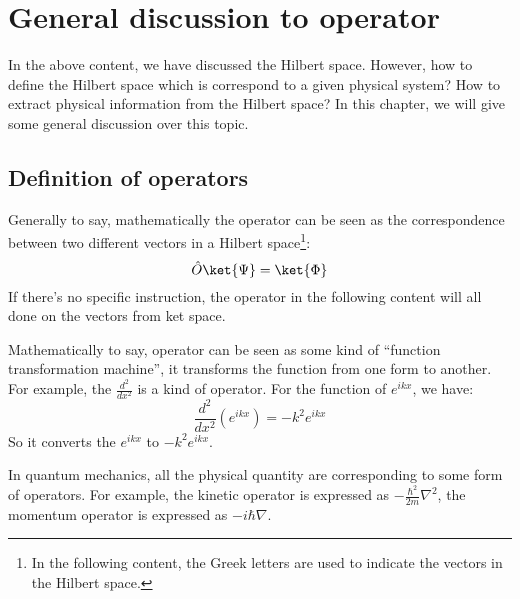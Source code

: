 %
%
%
%
%
%
%

\chapter{General discussion to operator}
%
%
%
%
In the above content, we have discussed the Hilbert space. However,
how to define the Hilbert space which is correspond to a given
physical system? How to extract physical information from the
Hilbert space? In this chapter, we will give some general discussion
over this topic.


\section{Definition of operators}
%
%
%
%
Generally to say, mathematically the operator can be seen as the
correspondence between two different vectors in a Hilbert
space\footnote{In the following content, the Greek letters are used
to indicate the vectors in the Hilbert space.}:
\begin{equation}\label{OPERATOReq:4}
\hat{O}\ket{\Psi} = \ket{\Phi}
\end{equation}
If there's no specific instruction, the operator in the following
content will all done on the vectors from ket space.

Mathematically to say, operator can be seen as some kind of ``function
transformation machine'', it transforms the function from one form to
another. For example, the $\frac{d^{2}}{dx^{2}}$ is a kind of
operator. For the function of $e^{ikx}$, we have:
\begin{equation}\label{}
\frac{d^{2}}{dx^{2}} (e^{ikx}) = -k^{2}e^{ikx}
\end{equation}
So it converts the $e^{ikx}$ to $-k^{2}e^{ikx}$.

In quantum mechanics, all the physical quantity are corresponding to
some form of operators. For example, the kinetic operator is expressed
as $-\frac{\hbar^{2}}{2m}\nabla^{2}$, the momentum operator is
expressed as $-i\hbar\nabla$.


